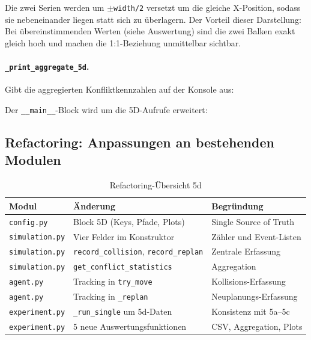 Die zwei Serien werden um $\pm$\texttt{width/2} versetzt um die gleiche X-Position, sodass sie nebeneinander liegen statt sich zu überlagern. Der Vorteil dieser Darstellung: Bei übereinstimmenden Werten (siehe Auswertung) sind die zwei Balken exakt gleich hoch und machen die 1:1-Beziehung unmittelbar sichtbar.

\paragraph{\texttt{\_print\_aggregate\_5d}.}
Gibt die aggregierten Konfliktkennzahlen auf der Konsole aus:



Der \texttt{\_\_main\_\_}-Block wird um die 5D-Aufrufe erweitert:




\subsection{Refactoring: Anpassungen an bestehenden Modulen}

\begin{table}[H]
    \centering
    \scriptsize
    \begin{tabular}{l l l}
        \toprule
        \textbf{Modul} & \textbf{Änderung} & \textbf{Begründung} \\
        \midrule
        \texttt{config.py} & Block 5D (Keys, Pfade, Plots) & Single Source of Truth \\
        \texttt{simulation.py} & Vier Felder im Konstruktor & Zähler und Event-Listen \\
        \texttt{simulation.py} & \texttt{record\_collision}, \texttt{record\_replan} & Zentrale Erfassung \\
        \texttt{simulation.py} & \texttt{get\_conflict\_statistics} & Aggregation \\
        \texttt{agent.py} & Tracking in \texttt{try\_move} & Kollisions-Erfassung \\
        \texttt{agent.py} & Tracking in \texttt{\_replan} & Neuplanungs-Erfassung \\
        \texttt{experiment.py} & \texttt{\_run\_single} um 5d-Daten & Konsistenz mit 5a--5c \\
        \texttt{experiment.py} & 5 neue Auswertungsfunktionen & CSV, Aggregation, Plots \\
        \bottomrule
    \end{tabular}
    \caption{Refactoring-Übersicht 5d}
    \label{tab:refactoring_5d}
\end{table}

